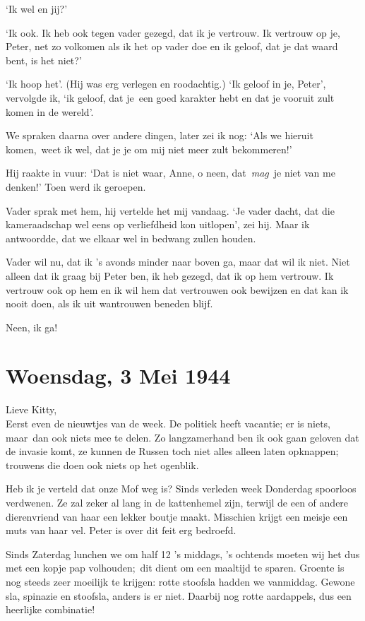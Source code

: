 \documentclass{book}
\begin{document}
`Ik wel en jij?'

`Ik ook. Ik heb ook tegen vader gezegd, dat ik je vertrouw. Ik vertrouw op je,
Peter, net zo volkomen als ik het op vader doe en ik geloof, dat je dat waard
bent, is het niet?'

`Ik hoop het'. (Hij was erg verlegen en roodachtig.) `Ik geloof in je, Peter',
vervolgde ik, `ik geloof, dat je~een goed karakter hebt en dat je vooruit zult
komen in de wereld'.

We spraken daarna over andere dingen, later zei ik nog: `Als we hieruit
komen,~weet ik wel, dat je je om mij niet meer zult bekommeren!'

Hij raakte in vuur: `Dat is niet waar, Anne, o neen, dat~\emph{mag}~je niet van
me denken!' Toen werd ik geroepen.

Vader sprak met hem, hij vertelde het mij vandaag. `Je vader dacht, dat die
kameraadschap wel eens op verliefdheid kon uitlopen', zei hij. Maar ik
antwoordde, dat we elkaar wel in bedwang zullen houden.

Vader wil nu, dat ik 's avonds minder naar boven ga, maar dat wil ik niet. Niet
alleen dat ik graag bij Peter ben, ik heb gezegd, dat ik op hem vertrouw. Ik
vertrouw ook op hem en ik wil hem dat vertrouwen ook bewijzen en dat kan ik
nooit doen, als ik uit wantrouwen beneden blijf.

Neen, ik ga!

\section*{Woensdag, 3 Mei 1944}

Lieve Kitty,\\
Eerst even de nieuwtjes van de week. De politiek heeft vacantie;
er is niets, maar~dan ook niets mee te delen. Zo langzamerhand ben ik ook gaan
geloven dat de invasie komt, ze kunnen de Russen toch niet alles alleen laten
opknappen; trouwens die doen ook niets op het ogenblik.

Heb ik je verteld dat onze Mof weg is? Sinds verleden week Donderdag spoorloos
verdwenen. Ze zal zeker al lang in de kattenhemel zijn, terwijl de een of andere
dierenvriend van haar een lekker boutje maakt.  Misschien krijgt een meisje een
muts van haar vel. Peter is over dit feit erg bedroefd.

Sinds Zaterdag lunchen we om half 12 's middags, 's ochtends moeten wij het dus
met een kopje pap volhouden;~dit dient om een maaltijd te sparen. Groente is nog
steeds zeer moeilijk te krijgen: rotte stoofsla hadden we vanmiddag. Gewone sla,
spinazie en stoofsla, anders is er niet. Daarbij nog rotte aardappels, dus een
heerlijke combinatie!
\end{document}
